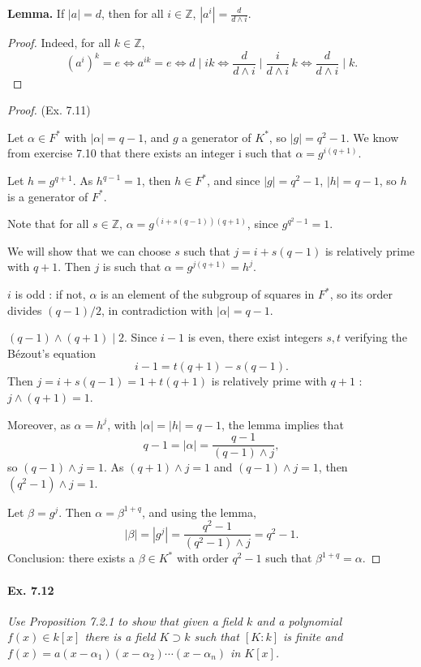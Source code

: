 \documentclass[11pt,a4paper]{article}
\newcommand{\Z}{\mathbb{Z}}
\begin{document}
{\bf Lemma.} If $|a| = d$, then for all $i \in \Z$, $| a^i | = \frac{d}{d\wedge i}$.
\begin{proof}
Indeed, for all $k \in \Z$,
$$(a^i)^k=e \iff a^{ik}=e \iff d \mid ik \iff \frac{d}{d \wedge i} \mid \frac{i}{d \wedge i}\,k \iff \frac{d}{d \wedge i} \mid k.$$
\end{proof}
\begin{proof}(Ex. 7.11)

Let $\alpha \in F^*$ with $|\alpha| = q-1$, and $g$ a generator of $K^*$, so $|g| = q^2-1$. We know from exercise 7.10 that there exists an integer i such that $\alpha = g^{i(q+1)}$.

Let $h = g^{q+1}$. As $h^{q-1} = 1$, then $h \in F^*$, and since $|g| = q^2-1$, $|h| = q-1$, so $h$ is a generator of $F^*$.

Note that for all $s\in \Z$, $\alpha = g^{(i+s(q-1))(q+1)}$, since $g^{q^2-1} = 1$.

We will show that we can choose $s$ such that $j = i +s(q-1)$ is relatively prime with $q+1$. Then  $j$ is such that $\alpha = g^{j(q+1)} = h^j$.


$i$ is odd : if not, $\alpha$ is an element of the subgroup of squares in $F^*$, so its order divides $(q-1)/2$, in contradiction with $|\alpha| = q-1$.

 $(q-1)\wedge (q+1) \mid 2$. Since $i-1$ is even, there exist integers $s,t$ verifying the B\'{e}zout's equation
$$i-1 = t(q+1)-s(q-1).$$
Then $j = i+s(q-1) = 1 + t(q+1)$ is relatively prime with $q+1$ : $j \wedge (q+1) = 1$.

Moreover, as $\alpha = h^j$, with $|\alpha| = |h| = q-1$, the lemma implies that
$$q-1 = |\alpha| = \frac{q-1}{(q-1)\wedge j},$$
so $(q-1) \wedge j = 1$.
As $(q+1) \wedge j = 1$ and $(q-1) \wedge j = 1$, then $(q^2-1) \wedge j = 1$.

Let $\beta = g^j$. Then $\alpha = \beta^{1+q}$, and using the lemma,
$$|\beta| = |g^j| = \frac{q^2-1}{(q^2-1)\wedge j} = q^2-1.$$
Conclusion:  there exists a $\beta \in K^*$ with order $q^2-1$ such that $\beta^{1+q} = \alpha$.
\end{proof}

\paragraph{Ex. 7.12}

{\it Use Proposition 7.2.1 to show that given a field $k$ and a polynomial $f(x) \in k[x]$ there is a field $K\supset k$ such that $[K:k]$ is finite and $f(x) = a(x-\alpha_1)(x-\alpha_2)\cdots(x-\alpha_n)$ in $K[x]$.
}
\end{document}
